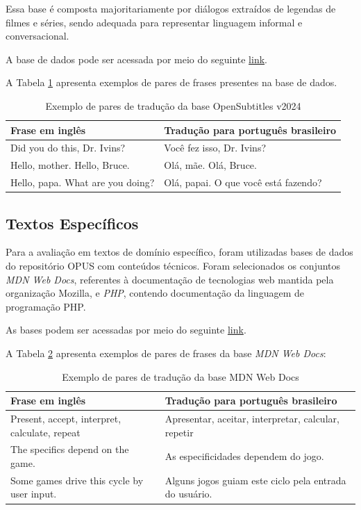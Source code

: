 Essa base é composta majoritariamente por diálogos extraídos de legendas de filmes e séries, sendo adequada para representar linguagem informal e conversacional.

A base de dados pode ser acessada por meio do seguinte \href{https://opus.nlpl.eu/datasets/OpenSubtitles?pair=en&pt-BR}{link}.

A Tabela \ref{tab:OpenSubtitlesv2024} apresenta exemplos de pares de frases presentes na base de dados.

\begin{table}[H]
\centering
\begin{tabular}{ |>{\centering\arraybackslash}p{6cm}|>{\centering\arraybackslash}p{6cm}| }
\hline
\textbf{Frase em inglês} & \textbf{Tradução para português brasileiro} \\
\hline
Did you do this, Dr. Ivins? & Você fez isso, Dr. Ivins? \\
\hline
Hello, mother. Hello, Bruce. & Olá, mãe. Olá, Bruce. \\
\hline
Hello, papa. What are you doing? & Olá, papai. O que você está fazendo? \\
\hline
\end{tabular}
\caption{Exemplo de pares de tradução da base OpenSubtitles v2024}
\label{tab:OpenSubtitlesv2024}
\end{table}



\subsection{Textos Específicos}

Para a avaliação em textos de domínio específico, foram utilizadas bases de dados do repositório OPUS com conteúdos técnicos. Foram selecionados os conjuntos \textit{MDN Web Docs}, referentes à documentação de tecnologias web mantida pela organização Mozilla, e \textit{PHP}, contendo documentação da linguagem de programação PHP.

As bases podem ser acessadas por meio do seguinte \href{https://opus.nlpl.eu/corpora-search/en&pt-BR}{link}.

A Tabela \ref{tab:MDNwebdocs} apresenta exemplos de pares de frases da base \textit{MDN Web Docs}:

\begin{table}[H]
\centering
\begin{tabular}{  |>{\centering\arraybackslash}p{6cm}|>{\centering\arraybackslash}p{6cm}| }
\hline
\textbf{Frase em inglês} & \textbf{Tradução para português brasileiro} \\
\hline
Present, accept, interpret, calculate, repeat & Apresentar, aceitar, interpretar, calcular, repetir \\
\hline
The specifics depend on the game. & As especificidades dependem do jogo. \\
\hline
Some games drive this cycle by user input. & Alguns jogos guiam este ciclo pela entrada do usuário. \\
\hline
\end{tabular}
\caption{Exemplo de pares de tradução da base MDN Web Docs}
\label{tab:MDNwebdocs}
\end{table}


